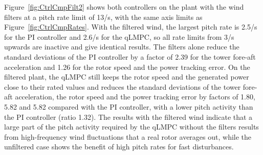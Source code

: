 Figure~\ref{fig:CtrlCmpFilt2} shows both controllers on the plant with the wind filters at a pitch rate limit of 13\textdegree/s, with the same axis limits as Figure~\ref{fig:CtrlCmpRates}. With the filtered wind, the largest pitch rate is 2.5\textdegree/s for the PI controller and 2.6\textdegree/s for the qLMPC, so all rate limits from 3\textdegree/s upwards are inactive and give identical results. The filters alone reduce the standard deviations of the PI controller by a factor of 2.39 for the tower fore-aft acceleration and 1.26 for the rotor speed and the power tracking error. On the filtered plant, the qLMPC still keeps the rotor speed and the generated power close to their rated values and reduces the standard deviations of the tower fore-aft acceleration, the rotor speed and the power tracking error by factors of 1.80, 5.82 and 5.82 compared with the PI controller, with a lower pitch activity than the PI controller (ratio 1.32). The results with the filtered wind indicate that a large part of the pitch activity required by the qLMPC without the filters results from high-frequency wind fluctuations that a real rotor averages out, while the unfiltered case shows the benefit of high pitch rates for fast disturbances.
